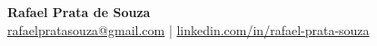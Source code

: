 \begin{center}
    \huge \textbf{Rafael Prata de Souza} \\[4pt]
    \normalsize
        \href{mailto:rafaelpratasouza@gmail.com}{rafaelpratasouza@gmail.com} |
        \href{https://www.linkedin.com/in/rafael-prata-souza}{linkedin.com/in/rafael-prata-souza}
    \normalsize
\end{center}

